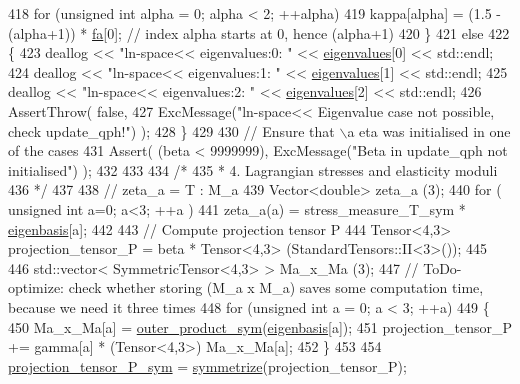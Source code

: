 \begin{DoxyCode}
418         \textcolor{keywordflow}{for} (\textcolor{keywordtype}{unsigned} \textcolor{keywordtype}{int} alpha = 0; alpha < 2; ++alpha)
419             kappa[alpha] = (1.5 - (alpha+1)) * \hyperlink{classln__space_aff1eab9675707d7aeed154aadb11adf4}{fa}[0]; \textcolor{comment}{// index alpha starts at 0, hence (alpha+1)}
420      \}
421      \textcolor{keywordflow}{else}
422      \{
423         deallog << \textcolor{stringliteral}{"ln-space<< eigenvalues:0: "} << \hyperlink{classln__space_aad33c1f308694e2801bbea7730d3b9c6}{eigenvalues}[0] << std::endl;
424         deallog << \textcolor{stringliteral}{"ln-space<< eigenvalues:1: "} << \hyperlink{classln__space_aad33c1f308694e2801bbea7730d3b9c6}{eigenvalues}[1] << std::endl;
425         deallog << \textcolor{stringliteral}{"ln-space<< eigenvalues:2: "} << \hyperlink{classln__space_aad33c1f308694e2801bbea7730d3b9c6}{eigenvalues}[2] << std::endl;
426         AssertThrow( \textcolor{keyword}{false},
427                      ExcMessage(\textcolor{stringliteral}{"ln-space<< Eigenvalue case not possible, check update\_qph!"}) );
428      \}
429 
430     \textcolor{comment}{// Ensure that \(\backslash\)a eta was initialised in one of the cases}
431      Assert( (beta < 9999999), ExcMessage(\textcolor{stringliteral}{"Beta in update\_qph not initialised"}) );
432 
433 
434     \textcolor{comment}{/*}
435 \textcolor{comment}{     * 4. Lagrangian stresses and elasticity moduli}
436 \textcolor{comment}{     */}
437 
438     \textcolor{comment}{// zeta\_a = T : M\_a}
439      Vector<double> zeta\_a (3);
440      \textcolor{keywordflow}{for} ( \textcolor{keywordtype}{unsigned} \textcolor{keywordtype}{int} a=0; a<3; ++a )
441          zeta\_a(a) = stress\_measure\_T\_sym * \hyperlink{classln__space_a1e67221edabbd2db69aa4a21262bd1f4}{eigenbasis}[a];
442 
443     \textcolor{comment}{// Compute projection tensor P}
444      Tensor<4,3> projection\_tensor\_P = beta * Tensor<4,3> (StandardTensors::II<3>());
445 
446      std::vector< SymmetricTensor<4,3> > Ma\_x\_Ma (3);
447      \textcolor{comment}{// ToDo-optimize: check whether storing (M\_a x M\_a) saves some computation time, because we need it
       three times}
448      \textcolor{keywordflow}{for} (\textcolor{keywordtype}{unsigned} \textcolor{keywordtype}{int} a = 0; a < 3; ++a)
449      \{
450          Ma\_x\_Ma[a] = \hyperlink{functions_8h_aa5f33021df9244e49e86b17b15286fa1}{outer\_product\_sym}(\hyperlink{classln__space_a1e67221edabbd2db69aa4a21262bd1f4}{eigenbasis}[a]);
451          projection\_tensor\_P += gamma[a] * (Tensor<4,3>) Ma\_x\_Ma[a];
452      \}
453 
454      \hyperlink{classln__space_a514a44d8b96a0cffeab11d39933299b5}{projection\_tensor\_P\_sym} = \hyperlink{functions_8h_afe83e9509497294b7f662b800b6b91ff}{symmetrize}(projection\_tensor\_P);

\end{DoxyCode}
